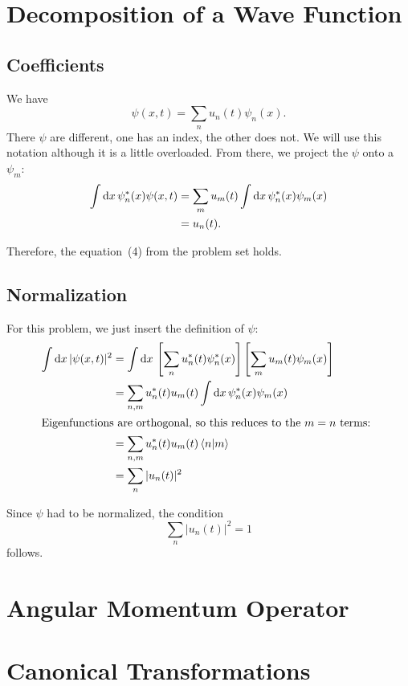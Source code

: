 \documentclass[11pt, ngerman, fleqn, DIV=15, headinclude]{scrartcl}
\begin{document}
\section{Decomposition of a Wave Function}

\subsection{Coefficients}

We have
\[
    \psi(x, t) = \sum_n u_n(t) \psi_n(x).
\]
There $\psi$ are different, one has an index, the other does not. We will use
this notation although it is a little overloaded. From there, we project the
$\psi$ onto a $\psi_m$:
\begin{align*}
    \int \dif x \, \psi_n^*(x) \psi(x, t)
    &= \sum_m u_m (t) \int \dif x \, \psi_n^*(x) \psi_m(x) \\
    &= u_n(t).
\end{align*}

Therefore, the equation~(4) from the problem set holds.

\subsection{Normalization}

For this problem, we just insert the definition of $\psi$:
\begin{align*}
    \int \dif x \, |\psi(x, t)|^2
    &= \int \dif x \, \sbr{\sum_n u_n^*(t) \psi_n^*(x)} \sbr{\sum_m u_m(t)
    \psi_m(x)} \\
    &= \sum_{n,m} u_n^*(t) u_m(t) \int \dif x \, \psi_n^*(x) \psi_m(x) \\
    \intertext{%
        Eigenfunctions are orthogonal, so this reduces to the $m = n$ terms:
    }
    &= \sum_{n,m} u_n^*(t) u_m(t) \braket{n|m} \\
    &= \sum_{n} |u_n(t)|^2
\end{align*}

Since $\psi$ had to be normalized, the condition
\[
    \sum_{n} |u_n(t)|^2 = 1
\]
follows.

\section{Angular Momentum Operator}

\section{Canonical Transformations}
\end{document}
